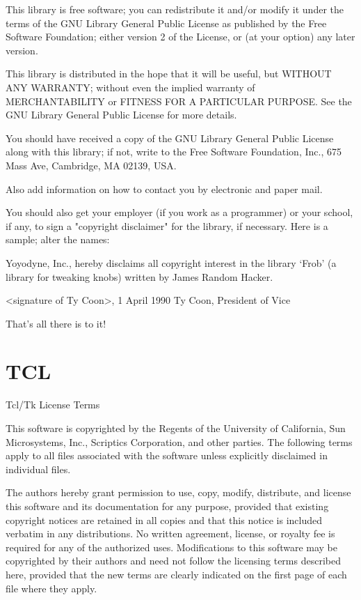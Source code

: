 \documentclass[twoside]{tceusermanual}
\begin{document}
    This library is free software; you can redistribute it and/or
    modify it under the terms of the GNU Library General Public
    License as published by the Free Software Foundation; either
    version 2 of the License, or (at your option) any later version.

    This library is distributed in the hope that it will be useful,
    but WITHOUT ANY WARRANTY; without even the implied warranty of
    MERCHANTABILITY or FITNESS FOR A PARTICULAR PURPOSE.  See the GNU
    Library General Public License for more details.

    You should have received a copy of the GNU Library General Public
    License along with this library; if not, write to the Free
    Software Foundation, Inc., 675 Mass Ave, Cambridge, MA 02139, USA.

Also add information on how to contact you by electronic and paper mail.

You should also get your employer (if you work as a programmer) or your
school, if any, to sign a "copyright disclaimer" for the library, if
necessary.  Here is a sample; alter the names:

  Yoyodyne, Inc., hereby disclaims all copyright interest in the
  library `Frob' (a library for tweaking knobs) written by James Random Hacker.

  <signature of Ty Coon>, 1 April 1990
  Ty Coon, President of Vice

That's all there is to it!

\section{TCL}

Tcl/Tk License Terms

This software is copyrighted by the Regents of the University of California, Sun Microsystems, Inc., Scriptics Corporation, and other parties. The following terms apply to all files associated with the software unless explicitly disclaimed in individual files.

The authors hereby grant permission to use, copy, modify, distribute, and license this software and its documentation for any purpose, provided that existing copyright notices are retained in all copies and that this notice is included verbatim in any distributions. No written agreement, license, or royalty fee is required for any of the authorized uses. Modifications to this software may be copyrighted by their authors and need not follow the licensing terms described here, provided that the new terms are clearly indicated on the first page of each file where they apply.
\end{document}
